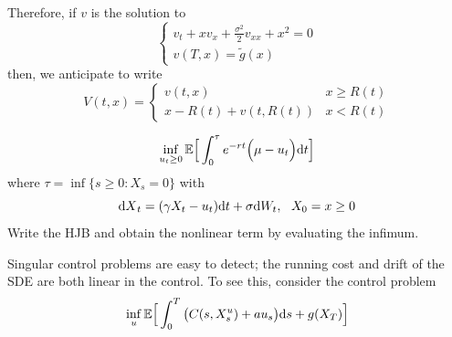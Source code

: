 \documentclass[11pt]{book}
\newcommand{\dt}{\text{\normalfont d}t}
\newcommand{\ds}{\text{\normalfont d}s}
\newcommand{\dX}{\text{\normalfont d}X}
\newcommand{\dW}{\text{\normalfont d}W}
\begin{document}
\begin{eg}
Therefore, if $v$ is the solution to 
    \begin{equation}\label{eqn:for v in sigular example}
        \begin{cases}
            {v}_{t} + x v_{x} + \frac{\sigma^2}{2} v_{xx}  + x^2 =0\\
            v(T,x)=\tilde{g}(x) 
        \end{cases}
    \end{equation}
    then, we anticipate to write 
    \begin{equation}
        V(t,x)=\begin{cases}
            v(t,x)& x\ge R(t)\\
            x-R(t)+v(t,R(t))& x< R(t)
        \end{cases}
    \end{equation}
        



\end{eg}
\begin{ex}\label{ex:DS}
    \begin{equation}
        \inf_{u_t\ge0}\mathbb{E}\Big[\int_0^\tau e^{-r t} \Big(\mu - u_t\Big){\dt}\Big]
    \end{equation}
    where $\tau=\inf\{s\ge0: X_s=0\}$ with
    \begin{equation}
        {\dX}_t=(\gamma X_t-u_t){\dt}+\sigma \dW_t, ~~ X_0=x\ge0
    \end{equation}
    Write the HJB and obtain the nonlinear term by evaluating the infimum. 
\end{ex}
Singular control problems are easy to detect; the running cost and drift of the SDE are both linear in the control. To see this, consider the control problem
\begin{equation}\label{eqn:dpp_singular}
        \inf_{u}\mathbb{E}\Big[\int_0^T \big(C(s,X^u_s)+au_s\big){{\ds}} + g(X_T)\Big]
    \end{equation}
\end{document}
